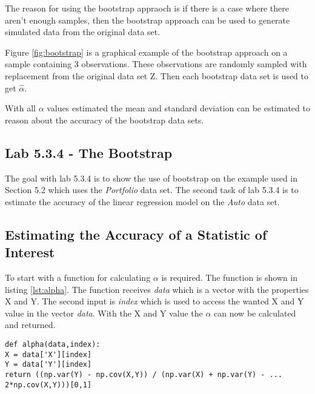 The reason for using the bootstrap appraoch is if there is a case where there aren't enough samples, then the bootstrap approach can be used to generate simulated data from the original data set.


Figure \ref{fig:bootstrap} is a graphical example of the bootstrap approach on a sample containing 3 observations. These observations are randomly sampled with replacement from the original data set Z. Then each bootstrap data set is used to get $\hat{\alpha}$.

With all $\alpha$ values estimated the mean and standard deviation can be estimated to reason about the accuracy of the bootstrap data sets.

\subsection{Lab 5.3.4 - The Bootstrap}

The goal with lab 5.3.4 is to show the use of bootstrap on the example used in Section 5.2\citep{ISLR} which uses the \emph{Portfolio} data set. The second task of lab 5.3.4 is to estimate the accuracy of the linear regression model on the \emph{Auto} data set.

\subsection{Estimating the Accuracy of a Statistic of Interest}

To start with a function for calculating $\alpha$ is required. The function is shown in listing \ref{lst:alpha}. The function receives \emph{data} which is a vector with the properties X and Y. The second input is \emph{index} which is used to access the wanted X and Y value in the vector \emph{data}.
With the X and Y value the $\alpha$ can now be calculated and returned.

\begin{lstlisting}[caption={Function for calculating $\alpha$ in python}, label=lst:alpha, mathescape=true]
def alpha(data,index):
X = data['X'][index]
Y = data['Y'][index]
return ((np.var(Y) - np.cov(X,Y)) / (np.var(X) + np.var(Y) - ...
2*np.cov(X,Y)))[0,1]
\end{lstlisting}

